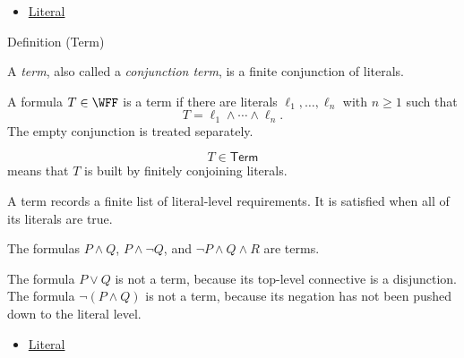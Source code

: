 \begin{dependencies}
\begin{itemize}
  \item \hyperref[def:literal-propositional-logic]{Literal}
\end{itemize}
\end{dependencies}

\begin{definitionbox}{Definition (Term)}
\begin{definition}[Term]
\label{def:term-propositional-logic}
A \emph{term}, also called a \emph{conjunction term}, is a finite conjunction
of literals.
\end{definition}
\end{definitionbox}

\begin{remark*}
A formula \(T\in\WFF\) is a term if there are literals
\(\ell_1,\ldots,\ell_n\) with \(n\ge 1\) such that
\[
T=\ell_1\land\cdots\land\ell_n.
\]
The empty conjunction is treated separately.
\end{remark*}

\begin{remark*}
\[
T\in\mathsf{Term}
\]
means that \(T\) is built by finitely conjoining literals.
\end{remark*}

\begin{remark*}[Interpretation]
A term records a finite list of literal-level requirements. It is satisfied
when all of its literals are true.
\end{remark*}

\begin{remark*}[Examples]
The formulas \(P\land Q\), \(P\land\neg Q\), and
\(\neg P\land Q\land R\) are terms.
\end{remark*}

\begin{remark*}
The formula \(P\lor Q\) is not a term, because its top-level connective is a
disjunction. The formula \(\neg(P\land Q)\) is not a term, because its negation
has not been pushed down to the literal level.
\end{remark*}

\begin{dependencies}
\begin{itemize}
  \item \hyperref[def:literal-propositional-logic]{Literal}
\end{itemize}
\end{dependencies}

